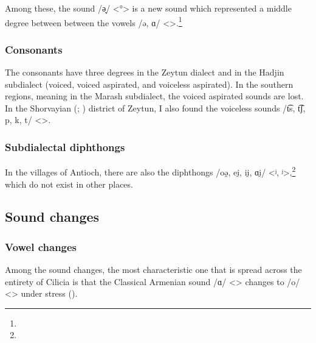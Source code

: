 Among these, the sound /ə̞/ <°> is a new sound which represented a middle degree between between the vowels /ə, ɑ/ <>.\footnote{}

\subsubsection{Consonants}
The consonants have three degrees in the Zeytun dialect and in the Hadjin subdialect (voiced, voiced aspirated, and voiceless aspirated). In the southern regions, meaning in the Marash subdialect, the voiced aspirated sounds are lost. In the Shorvayian (; ) district of Zeytun, I also found the voiceless sounds /t͡s, t͡ʃ, p, k, t/ <>.

\subsubsection{Subdialectal diphthongs}\label{sec:Cilicia:phono:segment:subdialect:diph}
In the villages of Antioch, there are also the diphthongs /oə̯, ei̯, ii̯, ɑi̯/ <ʲ, ʲ>,\footnote{} which do not exist in other places. 


\subsection{Sound changes}

\subsubsection{Vowel changes}

Among the sound changes, the most characteristic one that is spread across the entirety of Cilicia is that the Classical Armenian sound /ɑ/ <> changes to /o/ <> under stress (). 




